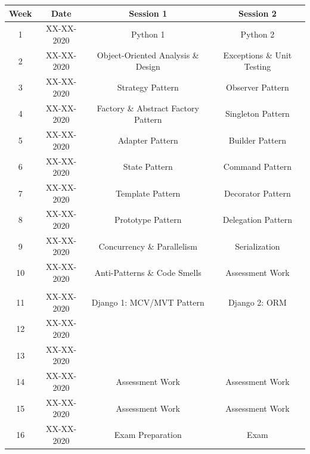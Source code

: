 \documentclass{article}
\begin{document}
\renewcommand{\arraystretch}{1.5}
\begin{tabular}{|c|c|c|c|}
	\hline
	\textbf{Week} & \textbf{Date} & \textbf{Session 1}                  & \textbf{Session 2}         \\ \hline
	1             & XX-XX-2020    & Python 1                            & Python 2                   \\ \hline
												
	2             & XX-XX-2020    & Object-Oriented Analysis \& Design  & Exceptions \& Unit Testing \\ \hline
	3             & XX-XX-2020    & Strategy Pattern                    & Observer Pattern           \\ \hline
	4             & XX-XX-2020    & Factory \& Abstract Factory Pattern & Singleton Pattern          \\ \hline
	5             & XX-XX-2020    & Adapter Pattern                     & Builder Pattern            \\ \hline
	6             & XX-XX-2020    & State Pattern                       & Command Pattern            \\ \hline
	7             & XX-XX-2020    & Template Pattern                    & Decorator Pattern          \\ \hline
	8             & XX-XX-2020    & Prototype Pattern                   & Delegation Pattern         \\ \hline
	9             & XX-XX-2020    & Concurrency \& Parallelism          & Serialization              \\ \hline
	10            & XX-XX-2020    & Anti-Patterns \& Code Smells        & Assessment Work            \\ \hline
	\rowcolor{yellow} \multicolumn{4}{|c|}{Mid Term Break}                                                      \\ \hline
	11            & XX-XX-2020    & Django 1: MCV/MVT Pattern           & Django 2: ORM          \\ \hline
	12            & XX-XX-2020    &                                     &                            \\ \hline
	13            & XX-XX-2020    &                                     &                            \\ \hline
	14            & XX-XX-2020    & Assessment Work                     & Assessment Work            \\ \hline
	15            & XX-XX-2020    & Assessment Work                     & Assessment Work            \\ \hline
	16            & XX-XX-2020    & Exam Preparation                    & Exam                       \\ \hline
\end{tabular}
\end{document}
